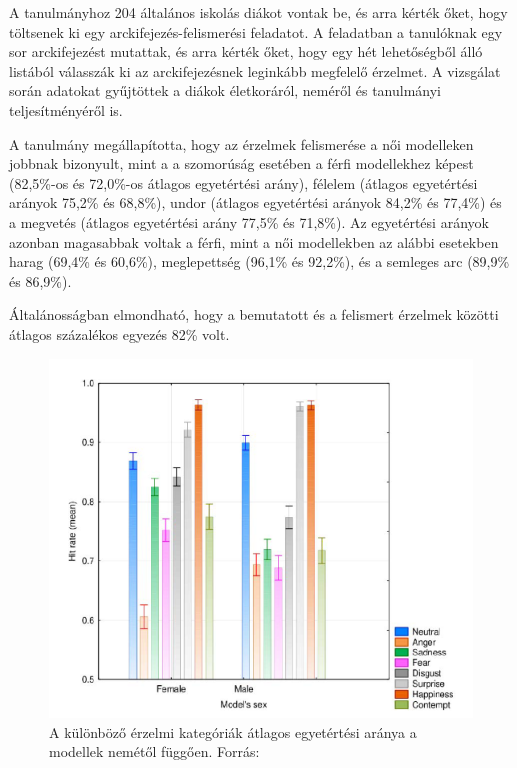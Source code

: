 \documentclass[12pt,a4]{article}
\begin{document}
    A tanulmányhoz 204 általános iskolás diákot vontak be, és arra kérték őket, hogy töltsenek ki egy arckifejezés-felismerési feladatot. A feladatban a tanulóknak egy sor arckifejezést mutattak, és arra kérték őket, hogy egy hét lehetőségből álló listából válasszák ki az arckifejezésnek leginkább megfelelő érzelmet. A vizsgálat során adatokat gyűjtöttek a diákok életkoráról, neméről és tanulmányi teljesítményéről is.

    A tanulmány megállapította, hogy az érzelmek felismerése a női modelleken jobbnak bizonyult, mint a
    a szomorúság esetében a férfi modellekhez képest (82,5\%-os és 72,0\%-os átlagos egyetértési arány),
    félelem (átlagos egyetértési arányok 75,2\% és 68,8\%), undor (átlagos egyetértési arányok
    84,2\% és 77,4\%) és a megvetés (átlagos egyetértési arány 77,5\% és 71,8\%). Az egyetértési arányok azonban magasabbak voltak a férfi, mint a női modellekben az alábbi esetekben
    harag (69,4\% és 60,6\%), meglepettség (96,1\% és 92,2\%),
    és a semleges arc (89,9\% és 86,9\%). 

    Általánosságban elmondható, hogy a bemutatott és a felismert érzelmek közötti átlagos százalékos egyezés
    82\% volt.

    
    
   \begin{figure}[h!]	
		\centering
		\includegraphics[width=1\linewidth]{facereqhuman.png}
        \caption{A különböző érzelmi kategóriák átlagos egyetértési aránya a modellek nemétől függően. Forrás: \cite{facerecresult}}
        \label{fig:humanfacerec}
	\end{figure}
\end{document}
